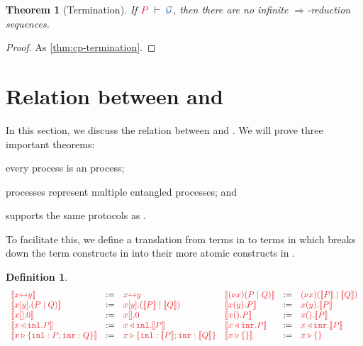 \documentclass[draft,submission,copyright,creativecommons]{eptcs}
\newtheorem{definition}{Definition}
\newtheorem{theorem}{Theorem}
\begin{document}
\begin{theorem}[Termination]\label{thm:hcp-termination}
  If $\seq[P]{\mathcal{G}}$, then there are no infinite
  $\Longrightarrow$-reduction sequences.
\end{theorem}\vspace*{-0.75\baselineskip}%
\begin{proof}
  As \cref{thm:cp-termination}.
\end{proof}


\section{Relation between \cp and \hcp}
\label{sec:cp2hcp}

In this section, we discuss the relation between \cp and \hcp.
We will prove three important theorems:
\begin{enumerate*}[label={\alph*)}]
\item every \cp process is an \hcp process;
\item \hcp processes represent multiple entangled \cp processes; and
\item \hcp supports the same protocols as \cp.
\end{enumerate*}
To facilitate this, we define a translation from terms in \cp to terms in \hcp
which breaks down the term constructs in \cp into their more atomic constructs
in \hcp.
\begin{definition}\label{def:cp2hcp-terms}
  \[
    \begin{array}{lcllcl}
         \tm{\mtf{\cpLink{x}{y}}}
      &  := & \tm{\cpLink{x}{y}}
      &  \tm{\mtf{\cpCut{x}{P}{Q}}}
      &  := & \tm{\piNew{x}{(\piPar{\mtf{P}}{\mtf{Q}})}}
      \\ \tm{\mtf{\cpSend{x}{y}{P}{Q}}}
      &  := & \tm{\piBoundSend{x}{y}{(\piPar{\mtf{P}}{\mtf{Q}})}}
      &  \tm{\mtf{\cpRecv{x}{y}{P}}}
      &  := & \tm{\piRecv{x}{y}{\mtf{P}}}
      \\ \tm{\mtf{\cpHalt{x}}}
      &  := & \tm{\piBoundSend{x}{}{\piHalt}}
      &  \tm{\mtf{\cpWait{x}{P}}}
      &  := & \tm{\piRecv{x}{}{\mtf{P}}}
      \\ \tm{\mtf{\cpInl{x}{P}}}
      &  := & \tm{\cpInl{x}{\mtf{P}}}
      &  \tm{\mtf{\cpInr{x}{P}}}
      &  := & \tm{\cpInr{x}{\mtf{P}}}
      \\ \tm{\mtf{\cpCase{x}{P}{Q}}}
      &  := & \tm{\cpCase{x}{\mtf{P}}{\mtf{Q}}}
      &  \tm{\mtf{\cpAbsurd{x}}}
      &  := & \tm{\cpAbsurd{x}}
    \end{array}
  \]
\end{definition}\noindent
\end{document}
